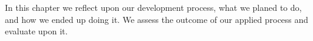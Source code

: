 In this chapter we reflect upon our development process, what we planed to do, and how we ended up doing it.
We assess the outcome of our applied process and evaluate upon it.
